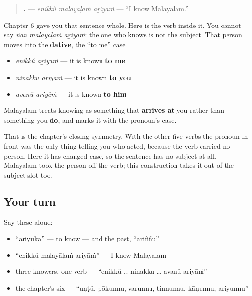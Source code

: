 \begin{grammarlens}[title={Grammar Lens: the knower leaves the subject slot}]
\begin{quote}
\textbf{  .} — \emph{enikkŭ malayāḷaṁ aṟiyāṁ} — \textquotedblleft{}I know Malayalam.\textquotedblright{}
\end{quote}

Chapter 6 gave you that sentence whole. Here is the verb inside it. You cannot say \emph{ñān malayāḷaṁ aṟiyāṁ}: the one who knows is not the subject. That person moves into the \textbf{dative}, the \textquotedblleft{}to me\textquotedblright{} case.

\begin{itemize}
\raggedright
  \item \emph{enikkŭ aṟiyāṁ} — it is known \textbf{to me}
  \item \emph{ninakku aṟiyāṁ} — it is known \textbf{to you}
  \item \emph{avanŭ aṟiyāṁ} — it is known \textbf{to him}
\end{itemize}

Malayalam treats knowing as something that \textbf{arrives at} you rather than something you \textbf{do}, and marks it with the pronoun's case.

That is the chapter's closing symmetry. With the other five verbs the pronoun in front was the only thing telling you who acted, because the verb carried no person. Here it has changed case, so the sentence has no subject at all. Malayalam took the person off the verb; this construction takes it out of the subject slot too.
\end{grammarlens}

\subsection*{Your turn}
Say these aloud:

\begin{itemize}
\raggedright
  \item \textquotedblleft{}aṟiyuka\textquotedblright{} — to know — and the past, \textquotedblleft{}aṟiññu\textquotedblright{}
  \item \textquotedblleft{}enikkŭ malayāḷaṁ aṟiyāṁ\textquotedblright{} — I know Malayalam
  \item three knowers, one verb — \textquotedblleft{}enikkŭ … ninakku … avanŭ aṟiyāṁ\textquotedblright{}
  \item the chapter's six — \textquotedblleft{}uṇṭŭ, pōkunnu, varunnu, tinnunnu, kāṇunnu, aṟiyunnu\textquotedblright{}
\end{itemize}

